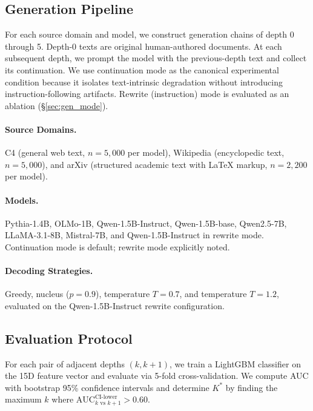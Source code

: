 \documentclass[11pt,a4paper]{article}
\newcommand{\Kstar}{K^{*}}
\begin{document}
\subsection{Generation Pipeline}

For each source domain and model, we construct generation chains of depth 0 through 5. Depth-0 texts are original human-authored documents. At each subsequent depth, we prompt the model with the previous-depth text and collect its continuation. We use continuation mode as the canonical experimental condition because it isolates text-intrinsic degradation without introducing instruction-following artifacts. Rewrite (instruction) mode is evaluated as an ablation (\S\ref{sec:gen_mode}).

\paragraph{Source Domains.} C4 (general web text, $n = 5{,}000$ per model), Wikipedia (encyclopedic text, $n = 5{,}000$), and arXiv (structured academic text with LaTeX markup, $n = 2{,}200$ per model).

\paragraph{Models.} Pythia-1.4B, OLMo-1B, Qwen-1.5B-Instruct, Qwen-1.5B-base, Qwen2.5-7B, LLaMA-3.1-8B, Mistral-7B, and Qwen-1.5B-Instruct in rewrite mode. Continuation mode is default; rewrite mode explicitly noted.

\paragraph{Decoding Strategies.} Greedy, nucleus ($p = 0.9$), temperature $T = 0.7$, and temperature $T = 1.2$, evaluated on the Qwen-1.5B-Instruct rewrite configuration.

\subsection{Evaluation Protocol}

For each pair of adjacent depths $(k, k+1)$, we train a LightGBM classifier on the 15D feature vector and evaluate via 5-fold cross-validation. We compute AUC with bootstrap 95\% confidence intervals and determine $\Kstar$ by finding the maximum $k$ where $\text{AUC}_{k \text{ vs } k+1}^{\text{CI-lower}} > 0.60$.

\end{document}

